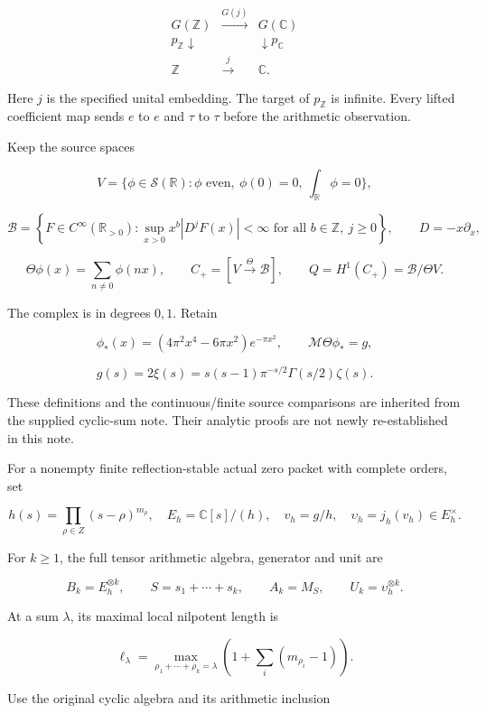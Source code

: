 \[
\boxed{
\begin{array}{ccc}
G(\mathbb Z)&\xrightarrow{G(j)}&G(\mathbb C)\\
p_{\mathbb Z}\downarrow&&\downarrow p_{\mathbb C}\\
\mathbb Z&\xrightarrow{j}&\mathbb C.
\end{array}
}
\]

Here \(j\) is the specified unital embedding. The target of
\(p_{\mathbb Z}\) is infinite. Every lifted coefficient map sends \(e\)
to \(e\) and \(\tau\) to \(\tau\) before the arithmetic observation.

Keep the source spaces

\[
V=\{\phi\in\mathcal S(\mathbb R):\phi\text{ even},\ \phi(0)=0,\ \int_{\mathbb R}\phi=0\},
\]

\[
\mathscr B=\left\{F\in C^\infty(\mathbb R_{>0}):
\sup_{x>0}x^b|D^jF(x)|<\infty\text{ for all }b\in\mathbb Z,\ j\geq0\right\},
\qquad D=-x\partial_x,
\]

\[
\Theta\phi(x)=\sum_{n\ne0}\phi(nx),
\qquad C_+=[V\xrightarrow{\Theta}\mathscr B],
\qquad Q=H^1(C_+)=\mathscr B/\Theta V.
\]

The complex is in degrees \(0,1\). Retain

\[
\phi_*(x)=(4\pi^2x^4-6\pi x^2)e^{-\pi x^2},
\qquad
\mathcal M\Theta\phi_*=g,
\]

\[
\boxed{
g(s)=2\xi(s)=s(s-1)\pi^{-s/2}\Gamma(s/2)\zeta(s).
}
\]

These definitions and the continuous/finite source comparisons are
inherited from the supplied cyclic-sum note. Their analytic proofs are
not newly re-established in this note.

For a nonempty finite reflection-stable actual zero packet with complete
orders, set

\[
h(s)=\prod_{\rho\in Z}(s-\rho)^{m_\rho},\quad
E_h=\mathbb C[s]/(h),\quad
v_h=g/h,\quad \upsilon_h=j_h(v_h)\in E_h^\times.
\]

For \(k\geq1\), the full tensor arithmetic algebra, generator and unit
are

\[
B_k=E_h^{\otimes k},\qquad
S=s_1+\cdots+s_k,\qquad A_k=M_S,\qquad U_k=\upsilon_h^{\otimes k}.
\]

At a sum \(\lambda\), its maximal local nilpotent length is

\[
\ell_\lambda=
\max_{\rho_1+\cdots+\rho_k=\lambda}
\left(1+\sum_i(m_{\rho_i}-1)\right).
\]

Use the original cyclic algebra and its arithmetic inclusion

